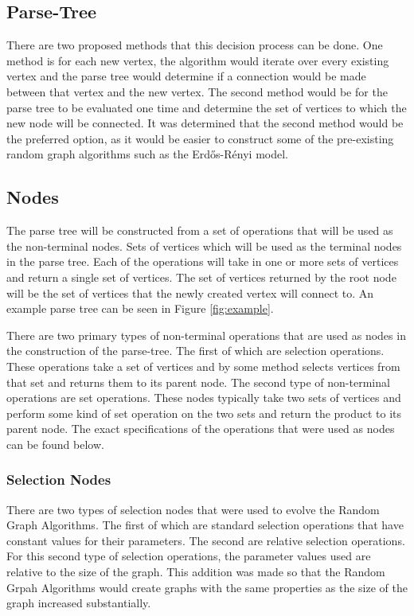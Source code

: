 \documentclass{article}
\begin{document}
\subsection{Parse-Tree}
There are two proposed methods that this decision process can be done. One method is for each new vertex, 
the algorithm would iterate over every existing vertex and the parse tree would determine if a 
connection would be made between that vertex and the new vertex. The second method would be for the parse 
tree to be evaluated one time and determine the set of vertices to which the new node will be connected.  
It was determined that the second method would be the preferred option, as it would be easier to 
construct some of the pre-existing random graph algorithms such as the Erd\H{o}s-R\'{e}nyi model.

\subsection{Nodes}
The parse tree will be constructed from a set of operations that will be used as the non-terminal 
nodes. Sets of vertices which will be used as the terminal nodes in the parse tree.  Each of the operations will take 
in one or more sets of vertices and return a single set of vertices. The set of vertices returned by the 
root node will be the set of vertices that the newly created vertex will connect to. 
An example parse tree can be seen in Figure \ref{fig:example}.

There are two primary types of non-terminal operations that are used as nodes in the construction of the parse-tree. The
first of which are selection operations. These operations take a set of vertices and by some method selects vertices from
that set and returns them to its parent node. The second type of non-terminal operations are set operations. These nodes 
typically take two sets of vertices and perform some kind of set operation on the two sets and return the product to its
parent node. The exact specifications of the operations that were used as nodes can be found below.

\subsubsection{Selection Nodes}
There are two types of selection nodes that were used to evolve the Random Graph Algorithms. The first of which are standard
selection operations that have constant values for their parameters. The second are relative selection operations. For this 
second type of selection operations, the parameter values used are relative to the size of the graph. This addition was made
so that the Random Grpah Algorithms would create graphs with the same properties as the size of the graph increased substantially. 
\end{document}
